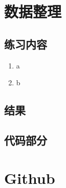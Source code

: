 \documentclass{article}
\begin{document}
	
	\section{数据整理}
	\subsection{练习内容}
	\begin{enumerate}
		\item a
		\item b
	\end{enumerate}
	\subsection{结果}
	\begin{figure}[h]
		\centering
		
	\end{figure}
	\subsection{代码部分}
	\begin{figure}[h]
		\centering
		
	\end{figure}
	
	
	\section{Github}
	
	
\end{document}
